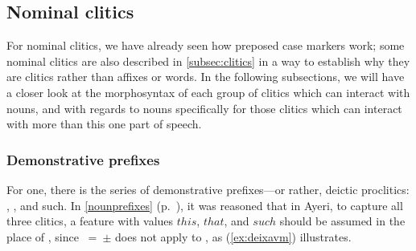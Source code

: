 
\subsection{Nominal clitics}
\label{subsec:nomcl}

For nominal clitics, we have already seen how preposed case markers work; some
nominal clitics are also described in \autoref{subsec:clitics} in a way to
establish why they are clitics rather than affixes or words. In the following
subsections, we will have a closer look at the morphosyntax of each group of
clitics which can interact with nouns, and with regards to nouns specifically
for those clitics which can interact with more than this one part of speech.

\subsubsection{Demonstrative prefixes}
\label{subsubsec:deixprocl}

For one, there is the series of demonstrative prefixes---or rather, deictic
proclitics: , , and 
{such}. In \autoref{nounprefixes} (p.~\pageref{nounprefixes}), it was
reasoned that in Ayeri, to capture all three clitics, a feature \Deix{} with
values $this$, $that$, and $such$ should be assumed in the place of \Prox{},
since \ups{\Prox{}}~=~$\pm$ does not apply to , as (\ref{ex:deixavm})
illustrates.

